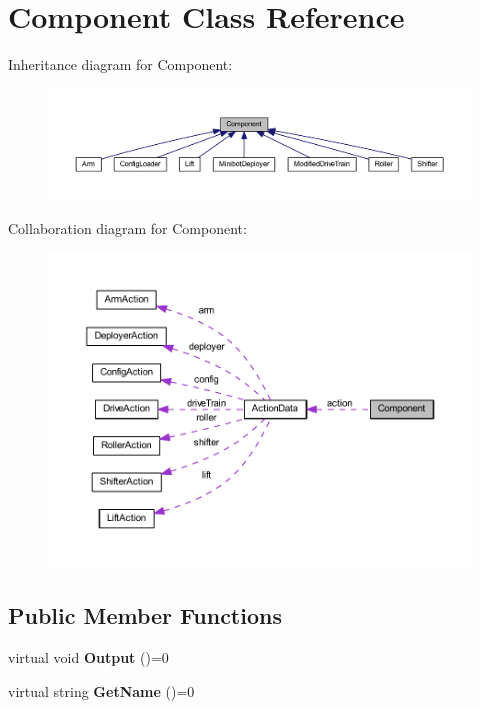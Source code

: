 \hypertarget{class_component}{
\section{\-Component \-Class \-Reference}
\label{class_component}
}


\-Inheritance diagram for \-Component\-:\nopagebreak
\begin{figure}[H]
\begin{center}
\leavevmode
\includegraphics[width=350pt]{class_component__inherit__graph}
\end{center}
\end{figure}


\-Collaboration diagram for \-Component\-:\nopagebreak
\begin{figure}[H]
\begin{center}
\leavevmode
\includegraphics[width=350pt]{class_component__coll__graph}
\end{center}
\end{figure}
\subsection*{\-Public \-Member \-Functions}
\begin{DoxyCompactItemize}
\item 
\hypertarget{class_component_a7d4181cf107d1aee4128dc1c3670d120}{
virtual void {\bfseries \-Output} ()=0}
\label{class_component_a7d4181cf107d1aee4128dc1c3670d120}

\item 
\hypertarget{class_component_a66794e7955105c819bb50c0cf0073192}{
virtual string {\bfseries \-Get\-Name} ()=0}
\label{class_component_a66794e7955105c819bb50c0cf0073192}

\end{DoxyCompactItemize}
